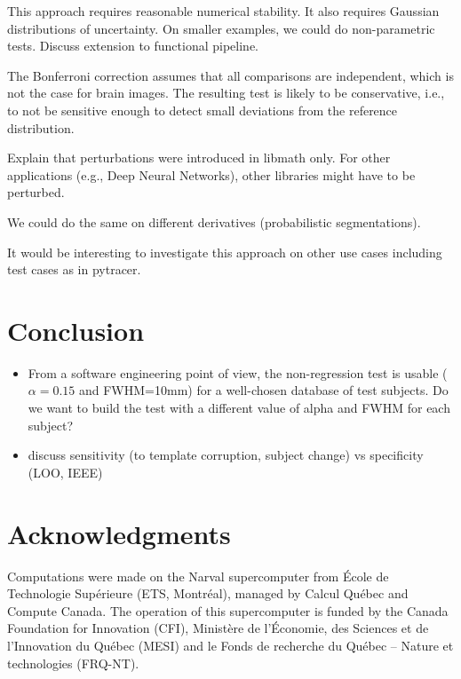 \documentclass{article}
\begin{document}
This approach requires reasonable numerical stability. It also requires Gaussian distributions of uncertainty.
On smaller examples, we could do non-parametric tests.
Discuss extension to functional pipeline.

The Bonferroni correction assumes that all comparisons are independent, which is
not the case for brain images. The resulting test is likely to be conservative,
i.e., to not be sensitive enough to detect small deviations from the reference
distribution.

Explain that perturbations were introduced in libmath only. For other
applications (e.g., Deep Neural Networks), other libraries might have to be
perturbed.

We could do the same on different derivatives (probabilistic segmentations).


It would be interesting to investigate this approach on other use cases
including test cases as in pytracer.

\section{Conclusion}
\begin{itemize}
    \item From a software engineering point of view, the non-regression test is usable
          ($\alpha=0.15$ and FWHM=10mm) for a well-chosen database of test subjects. Do we want
          to build the test with a different value of alpha and FWHM for each subject?
    \item discuss sensitivity (to template corruption, subject change) vs specificity (LOO, IEEE)
\end{itemize}
\section{Acknowledgments}

Computations were made on the Narval supercomputer from \'Ecole de Technologie
Sup\'erieure (ETS, Montr\'eal), managed by Calcul Québec and Compute Canada. The
operation of this supercomputer is funded by the Canada Foundation for
Innovation (CFI), Ministère de l’Économie, des Sciences et de l’Innovation du
Québec (MESI) and le Fonds de recherche du Québec – Nature et technologies
(FRQ-NT).
\end{document}

